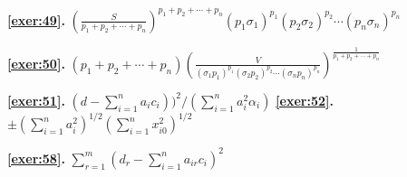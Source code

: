 \documentclass{article}
\newcommand{\dst}{\displaystyle}
\begin{document}
{\bf \ref{exer:49}.}
$\dst{\left(\frac{S}{p_{1}+p_{2}+\cdots+
p_{n}}\right)^{p_{1}+p_{2}+\cdots+p_{n}}
(p_{1}\sigma_{1})^{p_{1}}
(p_{2}\sigma_{2})^{p_{2}} \cdots
(p_{n}\sigma_{n})^{p_{n}}}$

\medskip

{\bf \ref{exer:50}.}
$\dst{(p_{1}+p_{2}+\cdots+p_{n})
\left(\frac{V}{(\sigma_{1}p_{1})^{p_{1}}(\sigma_{2}p_{2})^{p_{2}}
\cdots (\sigma_{ n}p_{n})^{p_{n}}}\right)^{\frac{1}{p_{1}+p_{2}+\cdots+p_{n}}}}$


{\bf \ref{exer:51}.}
$\dst{\left(d-\sum_{i=1}^{n}a_{i}c_{i}\right))^{2}/
\left(\sum_{i=1}^{n}a_{i}^{2}\alpha_{i}\right)}$
\quad
{\bf \ref{exer:52}.}
$\dst{\pm\left(\sum_{i=1}^{n}a_{i}^{2}\right)^{1/2}
\left(\sum_{i=1}^{n}x_{i0}^{2}\right)^{1/2}}$

\medskip
{\bf \ref{exer:58}.} $\dst\sum_{r=1}^{m}
\left(d_{r}-\sum_{i=1}^{n}a_{ir}c_{i}\right)^{2}$

\enlargethispage{\baselineskip}
\end{document}
